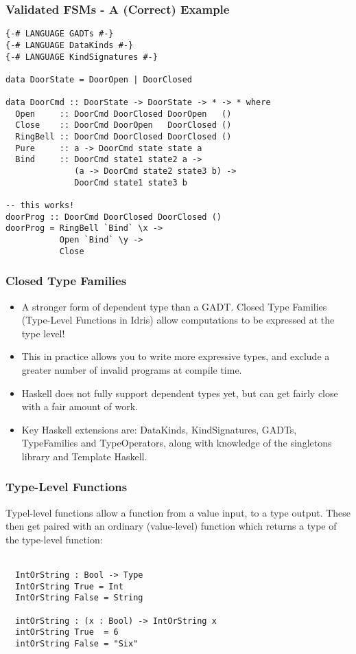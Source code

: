 \documentclass{beamer}
\begin{document}
\begin{frame}[fragile, shrink=10]
\frametitle{Validated FSMs - A (Correct) Example}
\begin{verbatim}
{-# LANGUAGE GADTs #-}
{-# LANGUAGE DataKinds #-}
{-# LANGUAGE KindSignatures #-}

data DoorState = DoorOpen | DoorClosed

data DoorCmd :: DoorState -> DoorState -> * -> * where
  Open     :: DoorCmd DoorClosed DoorOpen   ()  
  Close    :: DoorCmd DoorOpen   DoorClosed ()
  RingBell :: DoorCmd DoorClosed DoorClosed ()
  Pure     :: a -> DoorCmd state state a
  Bind     :: DoorCmd state1 state2 a -> 
              (a -> DoorCmd state2 state3 b) ->
              DoorCmd state1 state3 b

-- this works!
doorProg :: DoorCmd DoorClosed DoorClosed ()
doorProg = RingBell `Bind` \x ->  
           Open `Bind` \y -> 
           Close
\end{verbatim}
\end{frame}

\begin{frame}[fragile]
\frametitle{Closed Type Families}
  \begin{itemize}
    \item A stronger form of dependent type than a GADT. Closed Type Families
      (Type-Level Functions in Idris) allow computations to be expressed at 
      the type level!
    \item This in practice allows you to write more expressive types, and
      exclude a greater number of invalid programs at compile time.
    \item Haskell does not fully support dependent types yet, but can get
      fairly close with a fair amount of work.
    \item Key Haskell extensions are: DataKinds, KindSignatures, GADTs,
          TypeFamilies and TypeOperators, along with knowledge of the
          singletons library and Template Haskell.
  \end{itemize} 
\end{frame}

\begin{frame}[fragile]
\frametitle{Type-Level Functions}
Typel-level functions allow a function from a value input, to a type output.
These then get paired with an ordinary (value-level) function which returns a
type of the type-level function: \\ \\
\begin{minipage}{1\textwidth}
\begin{verbatim}
  IntOrString : Bool -> Type
  IntOrString True = Int
  IntOrString False = String

  intOrString : (x : Bool) -> IntOrString x
  intOrString True  = 6
  intOrString False = "Six"
\end{verbatim}
\end{minipage}
\end{frame}
\end{document}
